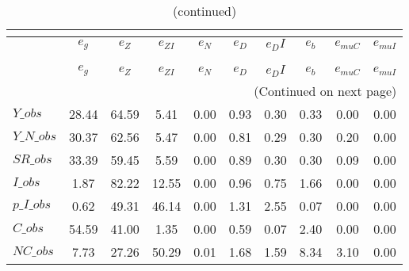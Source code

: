  
\begin{center}
\begin{longtable}{lccccccccc} 
\caption{VARIANCE DECOMPOSITION (in percent)}\\
 \label{Table:th_var_decomp_uncond}\\
\toprule 
$               $	 & 	 $        {e_g}$	 & 	 $        {e_Z}$	 & 	 $     {e_{ZI}}$	 & 	 $        {e_N}$	 & 	 $        {e_D}$	 & 	 $       {e_DI}$	 & 	 $        {e_b}$	 & 	 $    {e_{muC}}$	 & 	 $    {e_{muI}}$\\
\midrule \endfirsthead 
\caption{(continued)}\\
 \toprule \\ 
$               $	 & 	 $        {e_g}$	 & 	 $        {e_Z}$	 & 	 $     {e_{ZI}}$	 & 	 $        {e_N}$	 & 	 $        {e_D}$	 & 	 $       {e_DI}$	 & 	 $        {e_b}$	 & 	 $    {e_{muC}}$	 & 	 $    {e_{muI}}$\\
\midrule \endhead 
\midrule \multicolumn{10}{r}{(Continued on next page)} \\ \bottomrule \endfoot 
\bottomrule \endlastfoot 
$Y\_obs         $	 & 	        28.44	 & 	        64.59	 & 	         5.41	 & 	         0.00	 & 	         0.93	 & 	         0.30	 & 	         0.33	 & 	         0.00	 & 	         0.00 \\ 
$Y\_N\_obs      $	 & 	        30.37	 & 	        62.56	 & 	         5.47	 & 	         0.00	 & 	         0.81	 & 	         0.29	 & 	         0.30	 & 	         0.20	 & 	         0.00 \\ 
$SR\_obs        $	 & 	        33.39	 & 	        59.45	 & 	         5.59	 & 	         0.00	 & 	         0.89	 & 	         0.30	 & 	         0.30	 & 	         0.09	 & 	         0.00 \\ 
$I\_obs         $	 & 	         1.87	 & 	        82.22	 & 	        12.55	 & 	         0.00	 & 	         0.96	 & 	         0.75	 & 	         1.66	 & 	         0.00	 & 	         0.00 \\ 
$p\_I\_obs      $	 & 	         0.62	 & 	        49.31	 & 	        46.14	 & 	         0.00	 & 	         1.31	 & 	         2.55	 & 	         0.07	 & 	         0.00	 & 	         0.00 \\ 
$C\_obs         $	 & 	        54.59	 & 	        41.00	 & 	         1.35	 & 	         0.00	 & 	         0.59	 & 	         0.07	 & 	         2.40	 & 	         0.00	 & 	         0.00 \\ 
$NC\_obs        $	 & 	         7.73	 & 	        27.26	 & 	        50.29	 & 	         0.01	 & 	         1.68	 & 	         1.59	 & 	         8.34	 & 	         3.10	 & 	         0.00 \\ 

\end{longtable}
\end{center}
